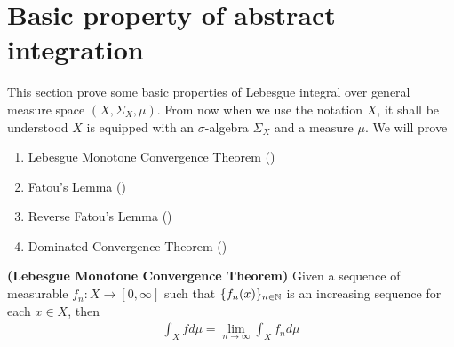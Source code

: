 \documentclass{report}
\begin{document}
\section{Basic property of abstract integration}
\begin{mdframed}
This section prove some basic properties of Lebesgue integral over general measure space $(X,\Sigma_X,\mu)$. From now when we use the notation $X$, it shall be understood $X$ is equipped with an $\sigma$-algebra $\Sigma_X$ and a measure $\mu$. We will prove 
\begin{enumerate}[label=(\alph*)]
  \item Lebesgue Monotone Convergence Theorem ()
  \item Fatou's Lemma ()
  \item Reverse Fatou's Lemma () 
  \item Dominated Convergence Theorem ()
\end{enumerate}
\end{mdframed}
\begin{theorem}
\label{LMCT}
\textbf{(Lebesgue Monotone Convergence Theorem)} Given a sequence of measurable $f_n:X\rightarrow [0,\infty]$ such that $\{ f_n(x) \}_{n\in\mathbb{N}}$ is an increasing sequence for each $x\in X$, then 
\begin{align*}
\int_X fd\mu = \lim_{n\to \infty}\int_X f_nd\mu
\end{align*}
\end{theorem}
\end{document}
